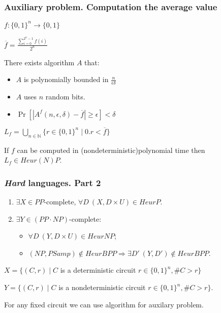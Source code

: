 \begin{frame}
    \frametitle{Auxiliary problem. Computation the average value}

    $f:\{0, 1\}^{n} \rightarrow \{0, 1\}$
    
    $\overline{f} = \frac{\sum\limits_{i = 0}^{2^n - 1}f(i)}{2^n}$

    \pause
    
    \begin{theorem}[Goldreich]
        There exists algorithm $A$ that:
        \begin{itemize}
	        \item $A$ is polynomially bounded in $\frac{n}{\epsilon\delta}$
        	\item {\color{blue}$A$ uses $n$ random bits}.
        	\item $\Pr[|A^{f}(n, \epsilon, \delta) - \overline{f}| \ge \epsilon] <
		        \delta$
        \end{itemize}
    \end{theorem}

    \pause
    $L_f = \bigcup\limits_{n \in \mathbb{N}}\{r \in \{0, 1\}^n \mid 0.r < \overline{f}\}$

    \begin{lemma}
        If $f$ can be computed in (nondeterministic)polynomial time then $L_f \in Heur(N)P$.
    \end{lemma}

\end{frame}


\begin{frame}
    \frametitle{\textit{Hard} languages. Part 2}
    \begin{theorem}
        \begin{enumerate}
            \item $\exists X \in PP$-complete, $\forall D~
	    		(X, D \times U) \in HeurP$.
    		\pause
    		\item $\exists Y \in (PP \cdot NP)$-complete:
		        \begin{itemize}
        	        \item $\forall D~ (Y, D \times U) \in HeurNP$;
                	\item $(NP, PSamp) \notin HeurBPP \Rightarrow \exists D'~ (Y, D')
                		\notin HeurBPP$.
		        \end{itemize}
        		
        \end{enumerate}
    \end{theorem}

    \pause
    $X = \{(C, r) \mid C$ is a deterministic circuit $r \in \{0, 1\}^n, \#C > r\}$
    
    $Y = \{(C, r) \mid C$ is a nondeterministic circuit $r \in \{0, 1\}^n, \#C >
    r\}$.

    \pause

    \vspace{0.2cm}
    For any fixed circuit we can use algorithm for auxilary problem.
\end{frame}



